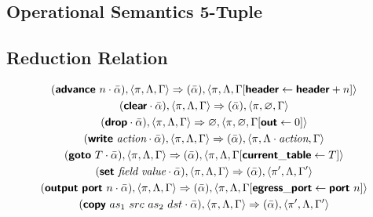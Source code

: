 \subsection{Operational Semantics 5-Tuple}

\subsection{Reduction Relation}
\setlength{\mathindent}{0pt}

\begin{mdframed}
\begin{gather*}
  (\bm{\mathsf{{advance}}}~n \cdot \bar\alpha), \langle \pi, \Lambda, \Gamma \rangle
  \Rightarrow
  (\bar\alpha), \langle \pi, \Lambda, \Gamma[\bm{\mathsf{{header}}}
  \leftarrow \bm{\mathsf{{header}}} + n] \rangle
\\
  (\bm{\mathsf{{clear}}} \cdot \bar\alpha), \langle \pi, \Lambda, \Gamma \rangle
  \Rightarrow
  (\bar\alpha), \langle \pi, \varnothing, \Gamma \rangle
\\
  (\bm{\mathsf{{drop}}} \cdot \bar\alpha), \langle \pi, \Lambda, \Gamma \rangle
  \Rightarrow
  \varnothing, \langle \pi, \varnothing, \Gamma [\bm{\mathsf{{out}}} \leftarrow 0] \rangle
\\
  (\bm{\mathsf{{write}}} \ \textit{action} \cdot \bar\alpha), \langle \pi, \Lambda,
  \Gamma \rangle
  \Rightarrow
  (\bar\alpha), \langle \pi, \Lambda \cdot \textit{action}, \Gamma \rangle
\\
  (\bm{\mathsf{{goto}}} \ T \cdot \bar\alpha),
  \langle \pi, \Lambda, \Gamma \rangle
  \Rightarrow
  (\bar\alpha), \langle \pi, \Lambda,
  \Gamma[\bm{\mathsf{{current\_table}}} \leftarrow T] \rangle
\\
  (\bm{\mathsf{{set}}} \ \textit{field} \ \textit{value} \cdot \bar\alpha), \langle \pi,
  \Lambda, \Gamma \rangle
  \Rightarrow
  (\bar\alpha), \langle \pi', \Lambda, \Gamma' \rangle
\\
  (\bm{\mathsf{{output}}} \ \bm{\mathsf{{port}}} \ n \cdot \bar \alpha), \langle \pi, \Lambda,
  \Gamma \rangle
  \Rightarrow
  (\bar\alpha), \langle \pi, \Lambda, \Gamma[\bm{\mathsf{{egress\_port}}}
  \leftarrow \bm{\mathsf{{port}}} \ n] \rangle
\\
  (\bm{\mathsf{{copy}}} \ as_1 \ src \ as_2 \ dst \cdot \bar\alpha), \langle \pi,
  \Lambda, \Gamma \rangle
  \Rightarrow
  (\bar\alpha), \langle \pi', \Lambda, \Gamma' \rangle
\end{gather*}
\end{mdframed}

